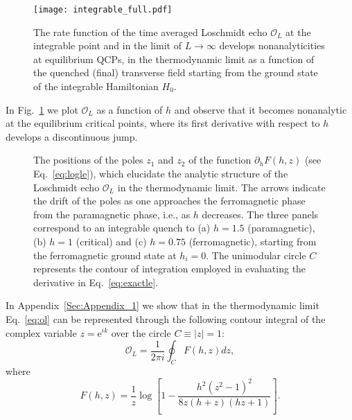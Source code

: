 \documentclass[aps,prx,twocolumn]{revtex4-2}
\begin{document}
\begin{figure}
	\centering
	\texttt{[image: integrable\_full.pdf]}
	
	\caption{ {The rate function of the time averaged Loschmidt echo $\mathcal{O}_L$  {at the integrable point and in the limit of $L\to\infty$} develops nonanalyticities at equilibrium QCPs, in the thermodynamic limit as a function of the quenched (final) transverse field starting from the ground state of the integrable Hamiltonian $H_0$.}}
	\label{fig:1} 
\end{figure}
In Fig.~\ref{fig:1} we  {plot $\mathcal O_L$ as a function of $h$ and observe that it becomes nonanalytic at the equilibrium critical points, where its first derivative with respect to $h$ develops a discontinuous jump}.
\begin{figure*}[ht]
	\caption{The positions of the poles $z_1$ and $z_2$  {of the function  {$\partial_hF(h,z)$} (see Eq.~\eqref{eq:logle}),  which elucidate the analytic structure of the Loschmidt echo $\mathcal{O}_L$}  {in the thermodynamic limit}.  The arrows indicate the drift of the poles as one approaches the ferromagnetic phase from the paramagnetic phase, i.e., as $h$ decreases. The three panels correspond to an integrable quench to (a) $h=1.5$ (paramagnetic), (b) $h=1$ (critical) and (c) $h=0.75$ (ferromagnetic), starting from the ferromagnetic ground state at $h_i=0$. The unimodular circle $C$ represents the contour of integration employed in evaluating the derivative in Eq.~\eqref{eq:exactle}.}
	\label{fig:2cover}
\end{figure*}
 {In Appendix~\ref{Sec:Appendix_1} we show that in the thermodynamic limit Eq.~\eqref{eq:ol} can be represented through the following contour integral of the complex variable $z=\mathrm e^{ik}$ over the circle $C\equiv|z|=1$}:
\begin{equation}\label{eq:exactle}
\mathcal{O}_L=\frac{1}{2\pi i}\oint_{C}F(h,z)dz,
\end{equation}
where 
\begin{equation}\label{eq:logle}
	F(h,z)=\frac{1}{z}\log\left[1-\frac{h^2 \left(z^2-1\right)^2}{8 z (h+z) (h z+1)}\right].
\end{equation}
\end{document}
